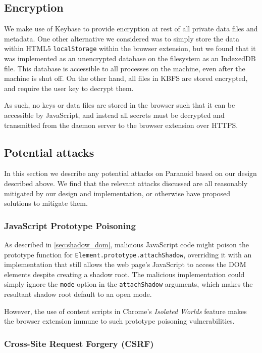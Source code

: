 \documentclass[letterpaper,twocolumn,10pt]{article}
\begin{document}
\subsection{Encryption}

We make use of Keybase to provide encryption at rest of all private data files and metadata. One other alternative we considered was to simply store the data within HTML5 \texttt{localStorage} within the browser extension, but we found that it was implemented as an unencrypted database on the filesystem as an IndexedDB file. This database is accessible to all processes on the machine, even after the machine is shut off. On the other hand, all files in KBFS are stored encrypted, and require the user key to decrypt them.

As such, no keys or data files are stored in the browser such that it can be accessible by JavaScript, and instead all secrets must be decrypted and transmitted from the daemon server to the browser extension over HTTPS.

\subsection{Potential attacks}

In this section we describe any potential attacks on Paranoid based on our design described above. We find that the relevant attacks discussed are all reasonably mitigated by our design and implementation, or otherwise have proposed solutions to mitigate them.

\subsubsection{JavaScript Prototype Poisoning}

As described in \cref{sec:shadow_dom}, malicious JavaScript code might poison the prototype function for \texttt{Element.prototype.attachShadow}, overriding it with an implementation that still allows the web page's JavaScript to access the DOM elements despite creating a shadow root. The malicious implementation could simply ignore the \texttt{mode} option in the \texttt{attachShadow} arguments, which makes the resultant shadow root default to an open mode.

However, the use of content scripts in Chrome's \textit{Isolated Worlds} feature \cite{ContentScript} makes the browser extension immune to such prototype poisoning vulnerabilities.

\subsubsection{Cross-Site Request Forgery (CSRF)}
\end{document}
